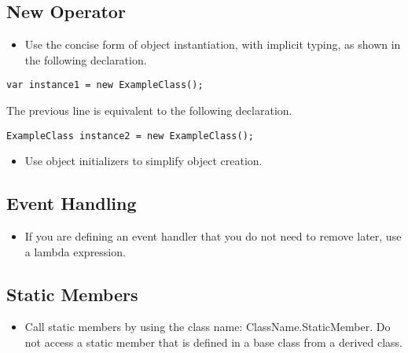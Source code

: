 \documentclass[11pt]{article}
\begin{document}
\subsection{New Operator} %
\label{sub:new_operator}
\begin{itemize}
	\item Use the concise form of object instantiation, with implicit typing, as shown in the following declaration.
\end{itemize}
\begin{lstlisting}
var instance1 = new ExampleClass();
\end{lstlisting}
The previous line is equivalent to the following declaration.
\begin{lstlisting}
ExampleClass instance2 = new ExampleClass();
\end{lstlisting}
\begin{itemize}
	\item Use object initializers to simplify object creation.
\end{itemize}

\subsection{Event Handling} %
\label{sub:event_handling}
\begin{itemize}
	\item If you are defining an event handler that you do not need to remove later, use a lambda expression.
\end{itemize}


\subsection{Static Members} %
\label{sub:static_members}
\begin{itemize}
	\item Call static members by using the class name: ClassName.StaticMember. Do not access a static member that is defined in a base class from a derived class.
\end{itemize}
\end{document}
